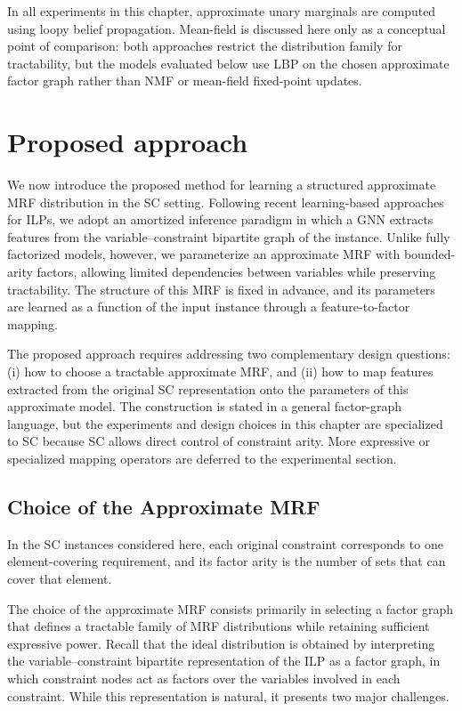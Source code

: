 In all experiments in this chapter, approximate unary marginals are computed using loopy belief propagation. Mean-field is discussed here only as a conceptual point of comparison: both approaches restrict the distribution family for tractability, but the models evaluated below use LBP on the chosen approximate factor graph rather than NMF or mean-field fixed-point updates.

\section{Proposed approach}
\label{sec:chapter_5_proposed_approach}

We now introduce the proposed method for learning a structured approximate MRF distribution in the SC setting. Following recent learning-based approaches for ILPs, we adopt an amortized inference paradigm in which a GNN extracts features from the variable--constraint bipartite graph of the instance. Unlike fully factorized models, however, we parameterize an approximate MRF with bounded-arity factors, allowing limited dependencies between variables while preserving tractability. The structure of this MRF is fixed in advance, and its parameters are learned as a function of the input instance through a feature-to-factor mapping.

The proposed approach requires addressing two complementary design questions: (i) how to choose a tractable approximate MRF, and (ii) how to map features extracted from the original SC representation onto the parameters of this approximate model. The construction is stated in a general factor-graph language, but the experiments and design choices in this chapter are specialized to SC because SC allows direct control of constraint arity. More expressive or specialized mapping operators are deferred to the experimental section.

\subsection{Choice of the Approximate MRF}
\label{subsec:chapter_5_choice_approximate_mrf}

In the SC instances considered here, each original constraint corresponds to one element-covering requirement, and its factor arity is the number of sets that can cover that element.

The choice of the approximate MRF consists primarily in selecting a factor graph that defines a tractable family of MRF distributions while retaining sufficient expressive power. Recall that the ideal distribution is obtained by interpreting the variable--constraint bipartite representation of the ILP as a factor graph, in which constraint nodes act as factors over the variables involved in each constraint. While this representation is natural, it presents two major challenges.

